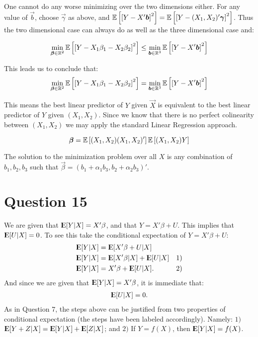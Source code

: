 \documentclass[12pt]{paper}
\newcommand{\Expect}{{\rm I\kern-.3em E}}
\begin{document}
One cannot do any worse minimizing over the two dimensions either. For
any value of $\vec{b}$, choose $\vec{\gamma}$ as above, and $\mathbb{E} \left [  \left [  Y -
  X' \bm{ b } \right ]^2 \right ] = \mathbb{E} \left [  \left [  Y - (X_1, X_2)' \bm{ \gamma } \right ]^2 \right ]$. Thus the two
dimensional case can always do as well as the three dimensional case
and:

\begin{equation*}
  \min_{\bm{ \beta } \in \mathbb{R}^2} \mathbb{E} \left [  \left [  Y - X_1 \beta_1 - X_2 \beta_2 \right ]^2 \right ] \leq
  \min_{\bm{ b } \in \mathbb{R}^3} \mathbb{E} \left [  \left [ Y - X' \bm{ b } \right ]^2 \right ]  
\end{equation*}

This leads us to conclude that:
\begin{equation*}
  \min_{\bm{ \beta } \in \mathbb{R}^2} \mathbb{E} \left [  \left [  Y - X_1 \beta_1 - X_2 \beta_2 \right ]^2 \right ] =
  \min_{\bm{ b } \in \mathbb{R}^3} \mathbb{E} \left [  \left [ Y - X' \bm{ b } \right ]^2 \right ]
\end{equation*}

This means the best linear predictor of $Y$ given $\vec{X}$ is equivalent to
the best linear predictor of $Y$ given $(X_1,X_2)$. Since we know that
there is no perfect colinearity between $(X_1,X_2)$ we may apply the
standard Linear Regression approach.

\begin{equation*}
  \bm{ \beta } = \mathbb{E} \left [  (X_1, X_2) (X_1, X_2)' \right ]\mathbb{E} \left [  (X_1, X_2)Y \right ] 
\end{equation*}

The solution to the minimization problem over all $X$ is any
combination of $b_1, b_2, b_3$ such that
$\vec{\beta} = (b_1 + \alpha_1 b_3, b_2 + \alpha_2 b_3)'$.

\section*{Question 15}

We are given that $\Expect[Y|X]=X' \beta$, and that $Y=X'\beta+U$. This implies that $\Expect[U|X]=0$. To see this take the conditional expectation of $Y=X'\beta+U$:
\begin{align*}
\Expect[Y|X]&=\Expect[X'\beta+U|X]\\
\Expect[Y|X]&=\Expect[X'\beta|X]+\Expect[U|X] &1)\\
\Expect[Y|X]&=X'\beta+\Expect[U|X]. &2)
\end{align*}
And since we are given that $\Expect[Y|X]=X' \beta$, it is immediate that:
\begin{align*}
\Expect[U|X]=0.
\end{align*}
As in Question 7, the steps above can be justified from two properties of conditional expectation (the steps have been labeled accordingly). Namely: $1)$ $\Expect[Y+Z|X]=\Expect[Y|X]+\Expect[Z|X]$; and $2)$ If $Y=f(X)$, then $\Expect[Y|X]=f(X)$.
\end{document}
